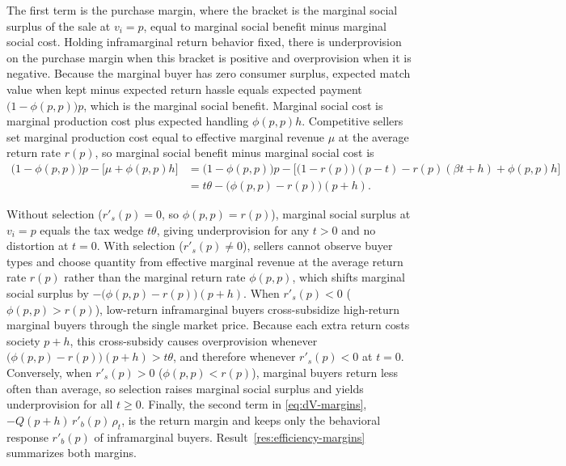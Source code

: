 \documentclass[11pt]{article}
\begin{document}
The first term is the purchase margin, where the bracket is the marginal
social surplus of the sale at $v_i=p$, equal to marginal social benefit minus
marginal social cost. Holding inframarginal return behavior fixed, there is
underprovision on the purchase margin when this bracket is positive and
overprovision when it is negative. Because the marginal buyer has zero
consumer surplus, expected match value when kept minus expected return hassle
equals expected payment $\bigl(1-\phi(p,p)\bigr)p$, which is the marginal
social benefit. Marginal social cost is marginal production cost plus
expected handling $\phi(p,p)h$. Competitive sellers set marginal production
cost equal to effective marginal revenue $\mu$ at the average return rate
$r(p)$, so marginal social benefit minus marginal social cost is
\begin{align*}
  \bigl(1-\phi(p,p)\bigr)p-\bigl[\mu+\phi(p,p)h\bigr]
  &=
  \bigl(1-\phi(p,p)\bigr)p
  -\bigl[\bigl(1-r(p)\bigr)(p-t)-r(p)(\beta t+h)+\phi(p,p)h\bigr]
  \\
  &=
  t\theta-\bigl(\phi(p,p)-r(p)\bigr)(p+h).
\end{align*}

Without selection ($r'_s(p)=0$, so $\phi(p,p)=r(p)$), marginal social surplus
at $v_i=p$ equals the tax wedge $t\theta$, giving underprovision for any $t>0$
and no distortion at $t=0$. With selection ($r'_s(p)\neq 0$), sellers cannot
observe buyer types and choose quantity from effective marginal revenue at the
average return rate $r(p)$ rather than the marginal return rate $\phi(p,p)$,
which shifts marginal social surplus by $-\bigl(\phi(p,p)-r(p)\bigr)(p+h)$.
When $r'_s(p)<0$ ($\phi(p,p)>r(p)$), low-return inframarginal buyers
cross-subsidize high-return marginal buyers through the single market price.
Because each extra return costs society $p+h$, this cross-subsidy causes
overprovision whenever $\bigl(\phi(p,p)-r(p)\bigr)(p+h)>t\theta$, and
therefore whenever $r'_s(p)<0$ at $t=0$. Conversely, when $r'_s(p)>0$
($\phi(p,p)<r(p)$), marginal buyers return less often than average, so
selection raises marginal social surplus and yields underprovision for all
$t\geq 0$. Finally, the second term in \eqref{eq:dV-margins},
$-Q(p+h)\,r'_b(p)\,\rho_t$, is the return margin and keeps only the behavioral
response $r'_b(p)$ of inframarginal buyers.
Result~\ref{res:efficiency-margins} summarizes both margins.
\end{document}
